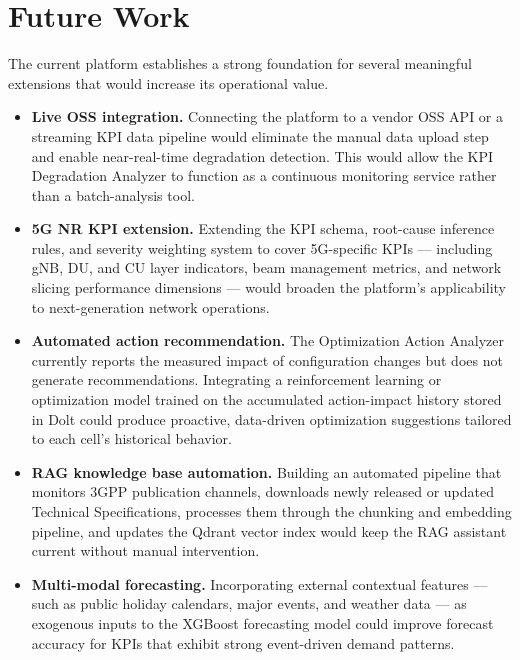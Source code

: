 \section{Future Work}

The current platform establishes a strong foundation for several meaningful extensions that would increase its operational value.

\begin{itemize}

    \item \textbf{Live OSS integration.} Connecting the platform to a vendor OSS API or a streaming KPI data pipeline would eliminate the manual data upload step and enable near-real-time degradation detection. This would allow the KPI Degradation Analyzer to function as a continuous monitoring service rather than a batch-analysis tool.

    \item \textbf{5G NR KPI extension.} Extending the KPI schema, root-cause inference rules, and severity weighting system to cover 5G-specific KPIs — including gNB, DU, and CU layer indicators, beam management metrics, and network slicing performance dimensions — would broaden the platform's applicability to next-generation network operations.

    \item \textbf{Automated action recommendation.} The Optimization Action Analyzer currently reports the measured impact of configuration changes but does not generate recommendations. Integrating a reinforcement learning or optimization model trained on the accumulated action-impact history stored in Dolt could produce proactive, data-driven optimization suggestions tailored to each cell's historical behavior.

    \item \textbf{RAG knowledge base automation.} Building an automated pipeline that monitors 3GPP publication channels, downloads newly released or updated Technical Specifications, processes them through the chunking and embedding pipeline, and updates the Qdrant vector index would keep the RAG assistant current without manual intervention.

    \item \textbf{Multi-modal forecasting.} Incorporating external contextual features — such as public holiday calendars, major events, and weather data — as exogenous inputs to the XGBoost forecasting model could improve forecast accuracy for KPIs that exhibit strong event-driven demand patterns.


\end{itemize}
